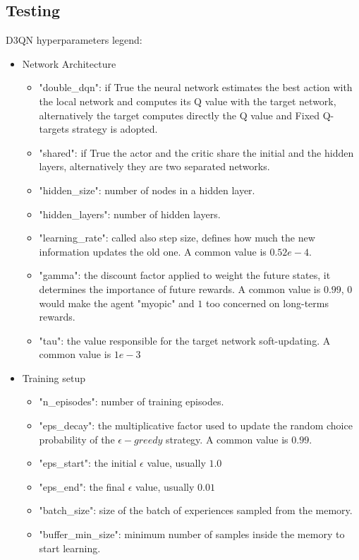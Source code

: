 \documentclass[11pt, a4paper, hidelinks]{report}
\begin{document}
\subsection{Testing}\label{subsec:testing2}

D3QN hyperparameters legend:
\begin{itemize}
	\item Network Architecture
	\begin{itemize}
		\item "double\_dqn": if True the neural network estimates the best action with the local network and computes its Q value with the target network, alternatively the target computes directly the Q value and Fixed Q-targets strategy is adopted.
		\item "shared": if True the actor and the critic share the initial and the hidden layers, alternatively they are two separated networks.
		\item "hidden\_size": number of nodes in a hidden layer.
		\item "hidden\_layers": number of hidden layers.
		\item "learning\_rate": called also step size, defines how much the new information updates the old one.
A common value is $0.52e-4$.
		\item "gamma": the discount factor applied to weight the future states, it determines the importance of future rewards.
A common value is $0.99$, $0$ would make the agent "myopic" and $1$ too concerned on long-terms rewards.
		\item "tau": the value responsible for the target network soft-updating.
A common value is $1e-3$
	\end{itemize}
	\item Training setup
	\begin{itemize}
		\item "n\_episodes": number of training episodes.
        \item "eps\_decay": the multiplicative factor used to update the random choice probability of the $\epsilon-greedy$ strategy.
A common value is $0.99$.
        \item "eps\_start": the initial $\epsilon$ value, usually $1.0$
        \item "eps\_end": the final $\epsilon$ value, usually $0.01$
		\item "batch\_size": size of the batch of experiences sampled from the memory.
		\item "buffer\_min\_size": minimum number of samples inside the memory to start learning.

\end{itemize}
\end{itemize}
\end{document}
